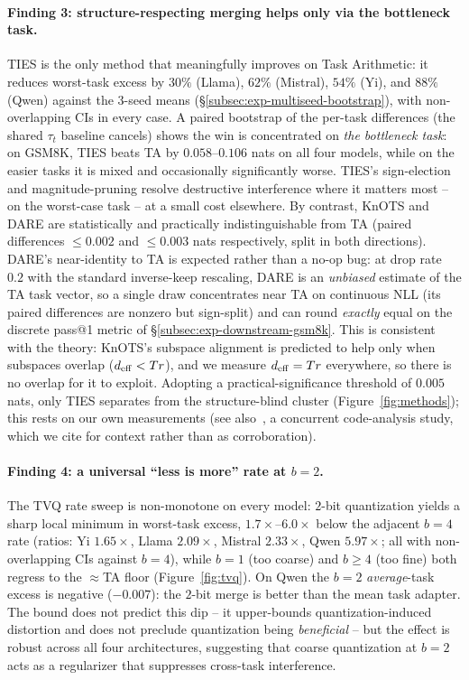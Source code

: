 \paragraph{Finding 3: structure-respecting merging helps only via
the bottleneck task.} TIES is the only method that meaningfully
improves on Task Arithmetic: it reduces worst-task excess by
$30\%$ (Llama), $62\%$ (Mistral), $54\%$ (Yi), and $88\%$ (Qwen)
against the $3$-seed means (\S\ref{subsec:exp-multiseed-bootstrap}),
with non-overlapping CIs in every case. A paired bootstrap of the
per-task differences (the shared $\tau_t$ baseline cancels) shows
the win is concentrated on \emph{the bottleneck task}: on GSM8K,
TIES beats TA by $0.058$--$0.106$ nats on all four models, while
on the easier tasks it is mixed and occasionally significantly
worse. TIES's sign-election and magnitude-pruning resolve
destructive interference where it matters most -- on the
worst-case task -- at a small cost elsewhere. By contrast, KnOTS
and DARE are statistically and practically indistinguishable from
TA (paired differences $\leq 0.002$ and $\leq 0.003$ nats
respectively, split in both directions). DARE's near-identity to TA
is expected rather than a no-op bug: at drop rate $0.2$ with the
standard inverse-keep rescaling, DARE is an \emph{unbiased} estimate
of the TA task vector, so a single draw concentrates near TA on
continuous NLL (its paired differences are nonzero but sign-split) and
can round \emph{exactly} equal on the discrete pass@1 metric of
\S\ref{subsec:exp-downstream-gsm8k}. This is consistent with
the theory: KnOTS's subspace alignment is predicted to help only
when subspaces overlap ($d_{\mathrm{eff}} < Tr$), and we measure $d_{\mathrm{eff}} = Tr$
everywhere, so there is no overlap for it to exploit. Adopting a
practical-significance threshold of $0.005$ nats, only TIES
separates from the structure-blind cluster
(Figure~\ref{fig:methods}); this rests on our own measurements (see
also~\cite{concurrent2026merging}, a concurrent code-analysis study,
which we cite for context rather than as corroboration).

\paragraph{Finding 4: a universal ``less is more'' rate at
$b=2$.} The TVQ rate sweep is non-monotone on every model: $2$-bit
quantization yields a sharp local minimum in worst-task excess,
$1.7\times$--$6.0\times$ below the adjacent $b=4$ rate (ratios:
Yi $1.65\times$, Llama $2.09\times$, Mistral $2.33\times$, Qwen
$5.97\times$; all with non-overlapping CIs against $b=4$), while
$b=1$ (too coarse) and $b\geq 4$ (too fine) both regress to the
$\approx$TA floor (Figure~\ref{fig:tvq}). On Qwen the
$b=2$ \emph{average}-task excess is negative ($-0.007$): the
$2$-bit merge is better than the mean task adapter. The bound does
not predict this dip -- it upper-bounds quantization-induced
distortion and does not preclude quantization being
\emph{beneficial} -- but the effect is robust across all four
architectures, suggesting that coarse quantization at $b=2$ acts
as a regularizer that suppresses cross-task interference.

